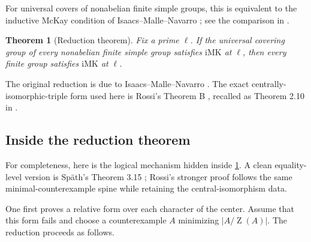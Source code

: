 \documentclass[11pt]{article}
\newtheorem{theorem}{Theorem}[section]
\newcommand{\Z}{\operatorname{Z}}
\newcommand{\IMK}{\mathrm{iMK}}
\begin{document}
For universal covers of nonabelian finite simple groups, this is
equivalent to the inductive McKay condition of
Isaacs--Malle--Navarro \cite{IsaacsMalleNavarro2007}; see the comparison
in \cite[Section 2.B]{CabanesSpath2026}.

\begin{theorem}[Reduction theorem]\label{thm:reduction}
Fix a prime \(\ell\).  If the universal covering group of every
nonabelian finite simple group satisfies \(\IMK\) at \(\ell\), then every
finite group satisfies \(\IMK\) at \(\ell\).
\end{theorem}

The original reduction is due to Isaacs--Malle--Navarro
\cite{IsaacsMalleNavarro2007}.  The exact centrally-isomorphic-triple
form used here is Rossi's Theorem B \cite{Rossi2023}, recalled as
Theorem 2.10 in \cite{CabanesSpath2026}.

\subsection{Inside the reduction theorem}

For completeness, here is the logical mechanism hidden inside
\cref{thm:reduction}.  A clean equality-level version is Sp{\"a}th's
Theorem 3.15 \cite{Spath2018}; Rossi's stronger proof follows the same
minimal-counterexample spine while retaining the central-isomorphism
data.

One first proves a relative form over each character of the center.
Assume that this form fails and choose a counterexample \(A\) minimizing
\(|A/\Z(A)|\).  The reduction proceeds as follows.
\end{document}
